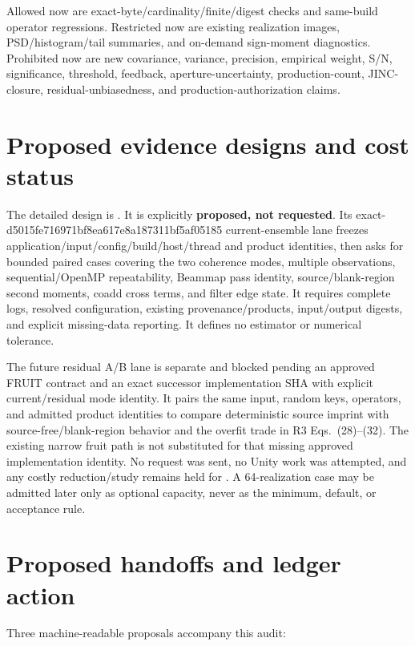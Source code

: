 \documentclass[10pt]{article}
\newcommand{\appsha}{d5015fe716971bf8ea617e8a187311bf5af05185}
\begin{document}
Allowed now are exact-byte/cardinality/finite/digest checks and same-build
operator regressions.  Restricted now are existing realization images,
PSD/histogram/tail summaries, and on-demand sign-moment diagnostics.  Prohibited
now are new covariance, variance, precision, empirical weight, S/N,
significance, threshold, feedback, aperture-uncertainty, production-count,
JINC-closure, residual-unbiasedness, and production-authorization claims.

\section{Proposed evidence designs and cost status}
\label{sec:evidence}

The detailed design is
.
It is explicitly \textbf{proposed, not requested}.  Its exact-\appsha{}
current-ensemble lane freezes application/input/config/build/host/thread and
product identities, then asks for bounded paired cases covering the two
coherence modes, multiple observations, sequential/OpenMP repeatability,
Beammap pass identity, source/blank-region second moments, coadd cross terms,
and filter edge state.  It requires complete logs, resolved configuration,
existing provenance/products, input/output digests, and explicit missing-data
reporting.  It defines no estimator or numerical tolerance.

The future residual A/B lane is separate and blocked pending an approved
FRUIT contract and an exact successor implementation SHA with explicit
current/residual mode identity.  It pairs the same input, random keys,
operators, and admitted product identities to compare deterministic source
imprint with source-free/blank-region behavior and the overfit trade in R3
Eqs.~(28)--(32).  The existing narrow fruit path is not substituted for that
missing approved implementation identity.  No request was sent, no Unity
work was attempted, and any costly reduction/study remains held for
.  A 64-realization case may be admitted later only
as optional capacity, never as the minimum, default, or acceptance rule.

\section{Proposed handoffs and ledger action}
\label{sec:handoffs}

Three machine-readable proposals accompany this audit:
\end{document}
